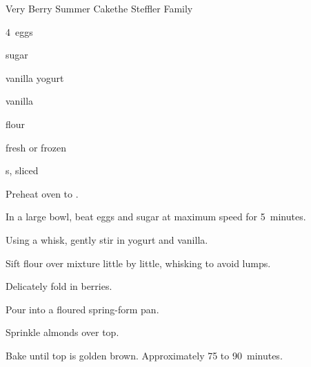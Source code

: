 \begin{recipe}{Very Berry Summer Cake}{the Steffler Family}{}

\begin{ingredients}
\item 4~eggs
\item \C{\threequarter} sugar
\item {} vanilla yogurt
\item {} vanilla
\item \C{1\quarter} flour
\item {} fresh or frozen 
\item \C{\quarter} s, sliced
\end{ingredients}

\begin{directions}
\item Preheat oven to .
\item In a large bowl, beat eggs and sugar at maximum speed for 5~minutes.
\item Using a whisk, gently stir in yogurt and vanilla.
\item Sift flour over mixture little by little, whisking to avoid lumps.
\item Delicately fold in berries.
\item Pour into a floured spring-form pan.
\item Sprinkle almonds over top.
\item Bake until top is golden brown. Approximately 75 to 90~minutes.
\end{directions}
\end{recipe}
